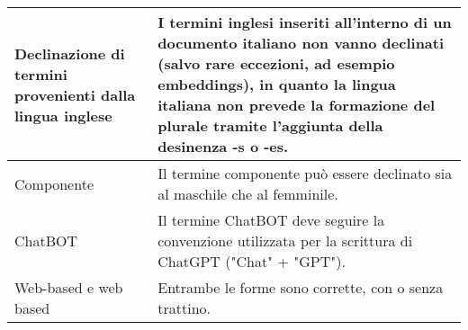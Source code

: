 \begin{adjustwidth}{-0.5cm}{-0.5cm}
\begin{longtable}{|P{4.5cm}|>{\raggedright\arraybackslash}P{9cm}|}
		\hline Declinazione di termini provenienti dalla lingua inglese & I termini inglesi inseriti all'interno di un documento italiano non vanno declinati (salvo rare eccezioni, ad esempio embeddings), in quanto la lingua italiana non prevede la formazione del plurale tramite l'aggiunta della desinenza -s o -es. \\
		\hline Componente & Il termine componente può essere declinato sia al maschile che al femminile. \\
		\hline ChatBOT & Il termine ChatBOT deve seguire la convenzione utilizzata per la scrittura di ChatGPT ("Chat" + "GPT"). \\
		\hline Web-based e web based & Entrambe le forme sono corrette, con o senza trattino. \\
	\end{longtable}
\end{adjustwidth}
\egroup
